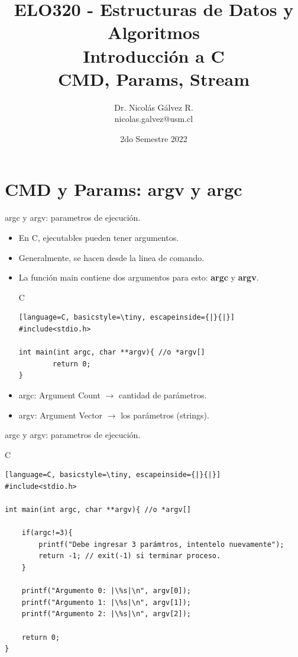 \documentclass{beamer}
\title{ELO320 - Estructuras de Datos y Algoritmos\\Introducción a C\\CMD, Params, Stream}
\author{Dr. Nicolás Gálvez R.\\{\small nicolas.galvez@usm.cl}}
\institute{Ing. Civil Telemática - Departamento de Electrónica}
\date{2do Semestre 2022}
\begin{document}
\frame{\titlepage}

%
%
\section{CMD y Params: argv y argc}

\begin{frame}[fragile]{argc y argv: parametros de ejecución.}
\begin{itemize}
	\item En C, ejecutables pueden tener argumentos. 
	\item Generalmente, se hacen desde la linea de comando. 
	\item La función main contiene dos argumentos para esto: \textbf{argc} y \textbf{argv}.
\begin{exampleblock}{C}
\begin{lstlisting}[language=C, basicstyle=\tiny, escapeinside={|}{|}]
#include<stdio.h>

int main(int argc, char **argv){ //o *argv[]
		return 0;
}
\end{lstlisting}
\end{exampleblock}
	\item argc: Argument Count $\rightarrow$ cantidad de parámetros.
	\item argv: Argument Vector $\rightarrow$ los parámetros (strings).
\end{itemize}
\end{frame}


\begin{frame}[fragile]{argc y argv: parametros de ejecución.}
\begin{exampleblock}{C}
\begin{lstlisting}[language=C, basicstyle=\tiny, escapeinside={|}{|}]
#include<stdio.h>

int main(int argc, char **argv){ //o *argv[]

	if(argc!=3){
		printf("Debe ingresar 3 parámtros, intentelo nuevamente");
		return -1; // exit(-1) si terminar proceso.
	}

	printf("Argumento 0: |\%s|\n", argv[0]);
	printf("Argumento 1: |\%s|\n", argv[1]);
	printf("Argumento 2: |\%s|\n", argv[2]);

	return 0;
}
\end{lstlisting}
\end{exampleblock}
\end{frame}
\end{document}
